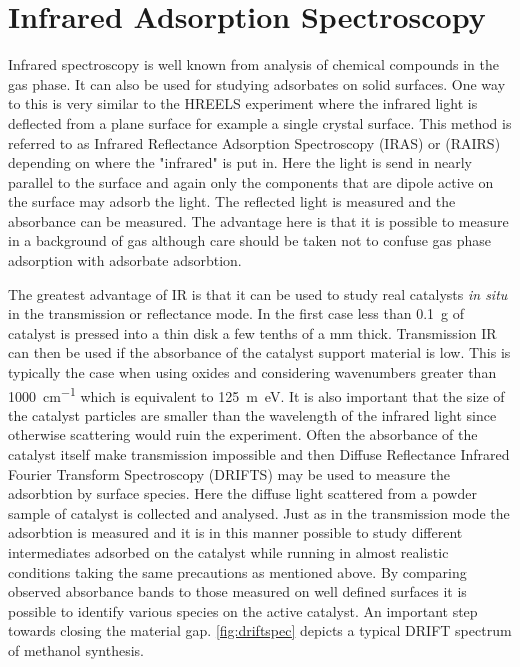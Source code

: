 \section{Infrared Adsorption Spectroscopy}
Infrared spectroscopy is well known from analysis of chemical compounds in the gas phase. It can also be used for studying adsorbates on solid surfaces. One way to this is very similar to the HREELS experiment where the infrared light is deflected from a plane surface for example a single crystal surface.  This method is referred to as Infrared Reflectance Adsorption Spectroscopy (IRAS) or (RAIRS) depending on where the "infrared" is put in. Here the light is send in nearly parallel to the surface and again only the components that are dipole active on the surface may adsorb the light. The reflected light is measured and the absorbance can be measured. The advantage here is that it is possible to measure in a background of gas although care should be taken not to confuse gas phase adsorption  with adsorbate adsorbtion. 

The greatest advantage of IR is that it can be used to study real catalysts {\it in situ} in the transmission or reflectance mode. In the first case less than \SI{0.1}{g} of catalyst is  pressed into a thin disk a few tenths of a \si{mm} thick. Transmission IR can then be used if the absorbance of the catalyst support material is low. This is typically the case when using oxides and considering wavenumbers greater than \SI{1000}{cm^{-1}} which is equivalent to \SI{125}{m\electronvolt}. It is also important that the size of the catalyst particles are smaller than the wavelength of the infrared light since otherwise scattering would ruin the experiment. Often the absorbance of the catalyst itself make transmission impossible and then Diffuse Reflectance Infrared  Fourier Transform Spectroscopy (DRIFTS) may be used to measure the adsorbtion by surface species. Here the diffuse light scattered from a powder sample of catalyst is collected and analysed. Just as in the transmission mode the adsorbtion is measured and it is in this manner possible to study different intermediates adsorbed on the catalyst while running in almost realistic conditions taking the same precautions as mentioned above. By comparing observed absorbance bands to those measured on well defined surfaces it is possible to identify various species on the active catalyst. An important step towards closing the material gap. \autoref{fig:driftspec} depicts a typical DRIFT spectrum of  methanol synthesis.

